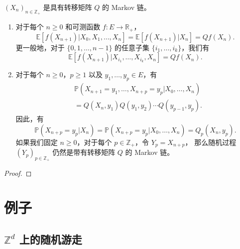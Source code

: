 \documentclass[fontset=none]{Notes}
\begin{document}
\begin{proposition}
  $(X_n)_{n\in \mathbb{Z}_+}$ 是具有转移矩阵 $Q$ 的 Markov 链。
  \begin{enumerate}
    \item 对于每个 $n\geq 0$ 和可测函数 $f:E\to \mathbb{R}_+$，
    \[
      \mathbb{E}[f(X_{n+1})|X_0,X_1,\dots,X_n]=\mathbb{E}[f(X_{n+1})|X_n]=Qf(X_n).
    \]
    更一般地，对于 $\{0,1,\dots,n-1\}$ 的任意子集 $\{i_1,\dots,i_k\}$，我们有
    \[
      \mathbb{E}[f(X_{n+1})|X_{i_1},\dots,X_{i_k},X_n]=Qf(X_n).
    \]
    \item 对于每个 $n\geq 0$，$p\geq 1$ 以及 $y_1,\dots,y_p\in E$，有
    \begin{align*}
      &\mathbb{P}(X_{n+1}=y_1,\dots,X_{n+p}=y_p|X_0,\dots,X_n)\\
      &=Q(X_n,y_1)Q(y_1,y_2)\cdots Q(y_{p-1},y_p).
    \end{align*}
    因此，有
    \[
      \mathbb{P}(X_{n+p}=y_p|X_n)=\mathbb{P}(X_{n+p}=y_p|X_0,\dots,X_n)=
      Q_p(X_n,y_p).
    \]
    如果我们固定 $n\geq 0$，对于每个 $p\in \mathbb{Z}_+$，令 $Y_p=X_{n+p}$，
    那么随机过程 $(Y_p)_{p\in \mathbb{Z}_+}$ 仍然是带有转移矩阵 $Q$ 的 Markov 链。
  \end{enumerate}
\end{proposition}
\begin{proof}
  
\end{proof}


\section{例子}

\subsection{$\mathbb{Z}^d$ 上的随机游走}
\end{document}
